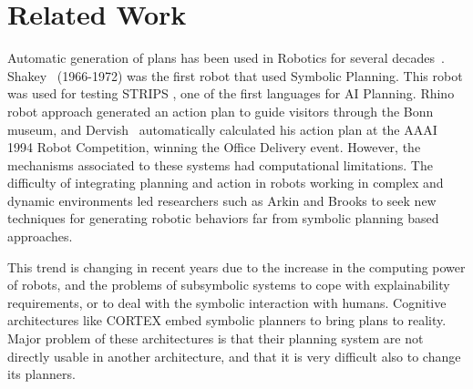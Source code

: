 \documentclass[letterpaper, 10 pt, conference]{IEEEtran}
\begin{document}

\section{Related Work}
\label{sec:related}


Automatic generation of plans has been used in Robotics for several decades~\cite{Nourbakhsh-1996-16261}. Shakey~\cite{Nilsson84} (1966-1972) was the first robot that used Symbolic Planning. This robot was used for testing STRIPS \cite{Fikes71}, one of the first languages for AI Planning. Rhino robot approach \cite{Burgard88} generated an action plan to guide visitors through the Bonn museum, and Dervish~\cite{Nourbakhsh_Powers_Birchfield_1995} automatically calculated his action plan at the AAAI 1994 Robot Competition, winning the Office Delivery event. However, the mechanisms associated to these systems had computational limitations. The difficulty of integrating planning and action in robots working in complex and dynamic environments led researchers such as Arkin \cite{Arkin89} and Brooks \cite{Brooks91} to seek new techniques for generating robotic behaviors far from symbolic planning based approaches.

This trend is changing in recent years due to the increase in the computing power of robots, and the problems of subsymbolic systems to cope with explainability requirements, or to deal with the symbolic interaction with humans. Cognitive architectures like CORTEX \cite{luis-pablo-cortex} embed symbolic planners to bring plans to reality. Major problem of these architectures is that their planning system are not directly usable in another architecture, and that it is very difficult also to change its planners.
\end{document}
